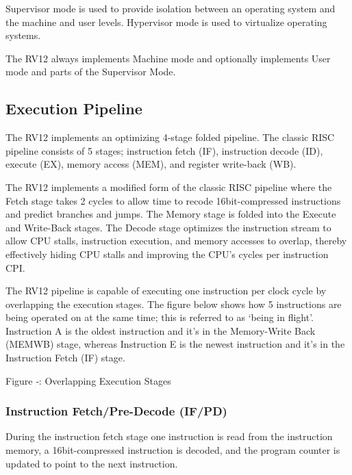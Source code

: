 Supervisor mode is used to provide isolation between an operating system
and the machine and user levels. Hypervisor mode is used to virtualize
operating systems.

The RV12 always implements Machine mode and optionally implements User mode and parts of the Supervisor Mode.

\subsection{Execution Pipeline}\label{execution-pipeline}

The RV12 implements an optimizing 4-stage folded pipeline. The classic RISC pipeline consists of 5 stages; instruction fetch (IF), instruction decode (ID), execute (EX), memory access (MEM), and register write-back (WB).

\missingfigure{}

The RV12 implements a modified form of the classic RISC pipeline where the
Fetch stage takes 2 cycles to allow time to recode 16bit-compressed
instructions and predict branches and jumps. The Memory stage is folded
into the Execute and Write-Back stages. The Decode stage optimizes the
instruction stream to allow CPU stalls, instruction execution, and
memory accesses to overlap, thereby effectively hiding CPU stalls and
improving the CPU's cycles per instruction CPI.

\missingfigure{}

The RV12 pipeline is capable of executing one instruction per clock
cycle by overlapping the execution stages. The figure below shows how 5
instructions are being operated on at the same time; this is referred to
as `being in flight'. Instruction A is the oldest instruction and it's
in the Memory-Write Back (MEMWB) stage, whereas Instruction E is the
newest instruction and it's in the Instruction Fetch (IF) stage.

\missingfigure{}

Figure ‑: Overlapping Execution Stages

\subsubsection{Instruction Fetch/Pre-Decode
(IF/PD)}\label{instruction-fetchpre-decode-ifpd}

During the instruction fetch stage one instruction is read from the
instruction memory, a 16bit-compressed instruction is decoded, and the
program counter is updated to point to the next instruction.

